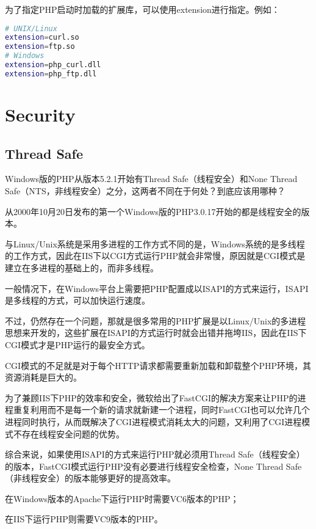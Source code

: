 为了指定PHP启动时加载的扩展库，可以使用extension进行指定。例如：

\begin{lstlisting}[language=bash]
# UNIX/Linux
extension=curl.so
extension=ftp.so
# Windows
extension=php_curl.dll
extension=php_ftp.dll
\end{lstlisting}



\chapter{Security}


\section{Thread Safe}

Windows版的PHP从版本5.2.1开始有Thread Safe（线程安全）和None Thread Safe（NTS，非线程安全）之分，这两者不同在于何处\cite{thread_safe}？到底应该用哪种？

从2000年10月20日发布的第一个Windows版的PHP3.0.17开始的都是线程安全的版本。

与Linux/Unix系统是采用多进程的工作方式不同的是，Windows系统的是多线程的工作方式，因此在IIS下以CGI方式运行PHP就会非常慢，原因就是CGI模式是建立在多进程的基础上的，而非多线程。

一般情况下，在Windows平台上需要把PHP配置成以ISAPI的方式来运行，ISAPI是多线程的方式，可以加快运行速度。


不过，仍然存在一个问题，那就是很多常用的PHP扩展是以Linux/Unix的多进程思想来开发的，这些扩展在ISAPI的方式运行时就会出错并拖垮IIS，因此在IIS下CGI模式才是PHP运行的最安全方式。

CGI模式的不足就是对于每个HTTP请求都需要重新加载和卸载整个PHP环境，其资源消耗是巨大的。

为了兼顾IIS下PHP的效率和安全，微软给出了FastCGI的解决方案来让PHP的进程重复利用而不是每一个新的请求就新建一个进程，同时FastCGI也可以允许几个进程同时执行，从而既解决了CGI进程模式消耗太大的问题，又利用了CGI进程模式不存在线程安全问题的优势。

综合来说，如果使用ISAPI的方式来运行PHP就必须用Thread Safe（线程安全）的版本，FastCGI模式运行PHP没有必要进行线程安全检查，None Thread Safe（非线程安全）的版本能够更好的提高效率。

\begin{compactitem}
\item 在Windows版本的Apache下运行PHP时需要VC6版本的PHP；
\item 在IIS下运行PHP则需要VC9版本的PHP。
\end{compactitem}

